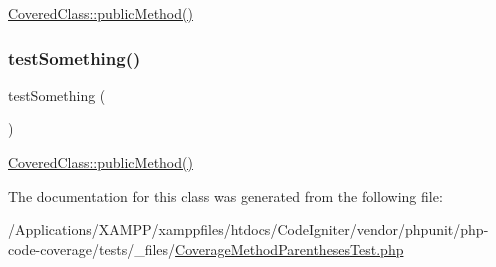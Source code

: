 \mbox{\hyperlink{class_covered_class_ab07dfd901b43d1dcdbc2d116d7f5a566}{Covered\+Class\+::public\+Method()}} \mbox{\label{class_coverage_method_parentheses_test_a0fc4e17369bc9607ebdd850d9eda8167}} 
\subsubsection{\texorpdfstring{test\+Something()}{testSomething()}\hspace{0.1cm}{\footnotesize\ttfamily [2/2]}}
{\footnotesize\ttfamily test\+Something (\begin{DoxyParamCaption}{ }\end{DoxyParamCaption})}

\mbox{\hyperlink{class_covered_class_ab07dfd901b43d1dcdbc2d116d7f5a566}{Covered\+Class\+::public\+Method()}} 

The documentation for this class was generated from the following file\+:\begin{DoxyCompactItemize}
\item 
/\+Applications/\+X\+A\+M\+P\+P/xamppfiles/htdocs/\+Code\+Igniter/vendor/phpunit/php-\/code-\/coverage/tests/\+\_\+files/\mbox{\hyperlink{php-code-coverage_2tests_2__files_2_coverage_method_parentheses_test_8php}{Coverage\+Method\+Parentheses\+Test.\+php}}\end{DoxyCompactItemize}
